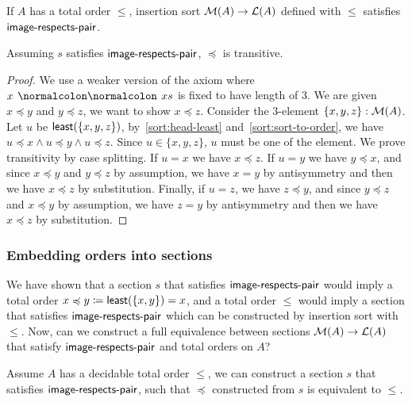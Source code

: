 \begin{proposition}
    If $A$ has a total order $\leq$, insertion sort $\mathcal{M}(A) \to \mathcal{L}(A)$ defined with $\leq$
    satisfies $\operatorname{\mathsf{image-respects-pair}}$.
\end{proposition}

\begin{proposition}\label{sort:trans}
    Assuming $s$ satisfies $\operatorname{\mathsf{image-respects-pair}}$, $\preccurlyeq$ is transitive.
\end{proposition}
\begin{proof}
    We use a weaker version of the axiom where $x \cons xs$ is fixed to have length of 3.
    We are given $x \preccurlyeq y$ and $y \preccurlyeq z$, we want to show $x \preccurlyeq z$.
    Consider the 3-element $\{x,y,z\} : \mathcal{M}(A)$. Let $u$ be $\operatorname{\mathsf{least}}(\{x,y,z\})$,
    by~\cref{sort:head-least} and~\cref{sort:sort-to-order},
    we have $u \preccurlyeq x \land u \preccurlyeq y \land u \preccurlyeq z$.
    Since $u \in \{x,y,z\}$, $u$ must be one of the element. We prove transitivity by case splitting.
    If $u = x$ we have $x \preccurlyeq z$. If $u = y$ we have $y \preccurlyeq x$, and since
    $x \preccurlyeq y$ and $y \preccurlyeq z$ by assumption,
    we have $x = y$ by antisymmetry and then we have $x \preccurlyeq z$ by substitution.
    Finally, if $u = z$, we have $z \preccurlyeq y$, and since
    $y \preccurlyeq z$ and $x \preccurlyeq y$ by assumption,
    we have $z = y$ by antisymmetry and then we have $x \preccurlyeq z$ by substitution.
\end{proof}

\subsubsection{Embedding orders into sections}

We have shown that a section $s$ that satisfies $\operatorname{\mathsf{image-respects-pair}}$ would imply a total order
$x \preccurlyeq y \mathrel{\coloneq} \operatorname{\mathsf{least}}(\{x, y\}) = x$,
and a total order $\leq$ would imply a section that satisfies $\operatorname{\mathsf{image-respects-pair}}$ which can
be constructed by insertion sort with $\leq$. Now, can we construct a full equivalence
between sections $\mathcal{M}(A) \to \mathcal{L}(A)$ that satisfy $\operatorname{\mathsf{image-respects-pair}}$ and total orders on $A$?

\begin{proposition}\label{sort:o2s2o}
    Assume $A$ has a decidable total order $\leq$, we can construct a section $s$ that
    satisfies $\operatorname{\mathsf{image-respects-pair}}$, such that $\preccurlyeq$ constructed from $s$ is equivalent
    to $\leq$.
\end{proposition}

